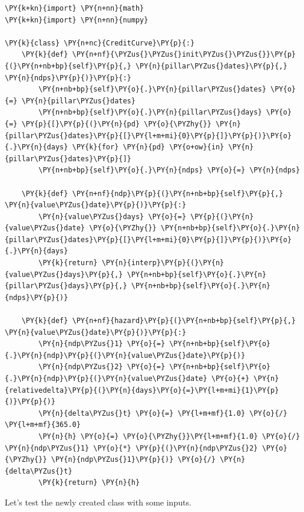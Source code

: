 \begin{codebox}
\begin{Verbatim}[commandchars=\\\{\}]
\PY{k+kn}{import} \PY{n+nn}{math}
\PY{k+kn}{import} \PY{n+nn}{numpy}

\PY{k}{class} \PY{n+nc}{CreditCurve}\PY{p}{:}
    \PY{k}{def} \PY{n+nf}{\PYZus{}\PYZus{}init\PYZus{}\PYZus{}}\PY{p}{(}\PY{n+nb+bp}{self}\PY{p}{,} \PY{n}{pillar\PYZus{}dates}\PY{p}{,} \PY{n}{ndps}\PY{p}{)}\PY{p}{:}    
        \PY{n+nb+bp}{self}\PY{o}{.}\PY{n}{pillar\PYZus{}dates} \PY{o}{=} \PY{n}{pillar\PYZus{}dates}
        \PY{n+nb+bp}{self}\PY{o}{.}\PY{n}{pillar\PYZus{}days} \PY{o}{=} \PY{p}{[}\PY{p}{(}\PY{n}{pd} \PY{o}{\PYZhy{}} \PY{n}{pillar\PYZus{}dates}\PY{p}{[}\PY{l+m+mi}{0}\PY{p}{]}\PY{p}{)}\PY{o}{.}\PY{n}{days} \PY{k}{for} \PY{n}{pd} \PY{o+ow}{in} \PY{n}{pillar\PYZus{}dates}\PY{p}{]}
        \PY{n+nb+bp}{self}\PY{o}{.}\PY{n}{ndps} \PY{o}{=} \PY{n}{ndps}
        
    \PY{k}{def} \PY{n+nf}{ndp}\PY{p}{(}\PY{n+nb+bp}{self}\PY{p}{,} \PY{n}{value\PYZus{}date}\PY{p}{)}\PY{p}{:}
        \PY{n}{value\PYZus{}days} \PY{o}{=} \PY{p}{(}\PY{n}{value\PYZus{}date} \PY{o}{\PYZhy{}} \PY{n+nb+bp}{self}\PY{o}{.}\PY{n}{pillar\PYZus{}dates}\PY{p}{[}\PY{l+m+mi}{0}\PY{p}{]}\PY{p}{)}\PY{o}{.}\PY{n}{days}
        \PY{k}{return} \PY{n}{interp}\PY{p}{(}\PY{n}{value\PYZus{}days}\PY{p}{,} \PY{n+nb+bp}{self}\PY{o}{.}\PY{n}{pillar\PYZus{}days}\PY{p}{,} \PY{n+nb+bp}{self}\PY{o}{.}\PY{n}{ndps}\PY{p}{)}
    
    \PY{k}{def} \PY{n+nf}{hazard}\PY{p}{(}\PY{n+nb+bp}{self}\PY{p}{,} \PY{n}{value\PYZus{}date}\PY{p}{)}\PY{p}{:}
        \PY{n}{ndp\PYZus{}1} \PY{o}{=} \PY{n+nb+bp}{self}\PY{o}{.}\PY{n}{ndp}\PY{p}{(}\PY{n}{value\PYZus{}date}\PY{p}{)}
        \PY{n}{ndp\PYZus{}2} \PY{o}{=} \PY{n+nb+bp}{self}\PY{o}{.}\PY{n}{ndp}\PY{p}{(}\PY{n}{value\PYZus{}date} \PY{o}{+} \PY{n}{relativedelta}\PY{p}{(}\PY{n}{days}\PY{o}{=}\PY{l+m+mi}{1}\PY{p}{)}\PY{p}{)}
        \PY{n}{delta\PYZus{}t} \PY{o}{=} \PY{l+m+mf}{1.0} \PY{o}{/} \PY{l+m+mf}{365.0}
        \PY{n}{h} \PY{o}{=} \PY{o}{\PYZhy{}}\PY{l+m+mf}{1.0} \PY{o}{/} \PY{n}{ndp\PYZus{}1} \PY{o}{*} \PY{p}{(}\PY{n}{ndp\PYZus{}2} \PY{o}{\PYZhy{}} \PY{n}{ndp\PYZus{}1}\PY{p}{)} \PY{o}{/} \PY{n}{delta\PYZus{}t}
        \PY{k}{return} \PY{n}{h}
\end{Verbatim}
\end{codebox}    
\noindent
Let's test the newly created class with some inputs.
